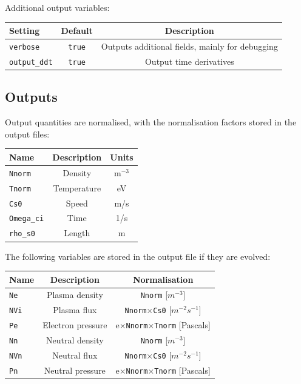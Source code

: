 \documentclass[12pt,a4paper]{article}
\begin{document}
Additional output variables:
\begin{center}
\begin{tabular}{l c c}
  Setting & Default & Description \\
  \hline
  \texttt{verbose} & \texttt{true} & Outputs additional fields, mainly for debugging\\
  \texttt{output\_ddt} & \texttt{true} & Output time derivatives \\
  \hline
\end{tabular}
\end{center}

\subsection{Outputs}
\label{sec:output}

Output quantities are normalised, with the normalisation factors stored in the output files:
\begin{center}
\begin{tabular}{l c c}
  Name & Description & Units \\
  \hline
  \texttt{Nnorm}  & Density  & m$^{-3}$\\
  \texttt{Tnorm}  & Temperature  & eV\\
  \texttt{Cs0}  & Speed  & m/s \\
  \texttt{Omega\_ci} & Time & 1/s \\
  \texttt{rho\_s0} & Length & m \\
  \hline
\end{tabular}
\end{center}

\noindent The following variables are stored in the output file if they are evolved:

\begin{center}
\begin{tabular}{l c c}
  Name & Description & Normalisation \\
  \hline
  \texttt{Ne}  & Plasma density  & \texttt{Nnorm} [$m^{-3}$]\\
  \texttt{NVi} & Plasma flux  & \texttt{Nnorm}$\times$\texttt{Cs0} [$m^{-2}s^{-1}$]\\
  \texttt{Pe}   & Electron pressure & e$\times$\texttt{Nnorm}$\times$\texttt{Tnorm} [Pascals] \\
  \texttt{Nn}  & Neutral density & \texttt{Nnorm} [$m^{-3}$] \\
  \texttt{NVn} & Neutral flux  & \texttt{Nnorm}$\times$\texttt{Cs0} [$m^{-2}s^{-1}$]\\
  \texttt{Pn}  & Neutral pressure & e$\times$\texttt{Nnorm}$\times$\texttt{Tnorm} [Pascals] \\
  \hline
\end{tabular}
\end{center}
\end{document}
